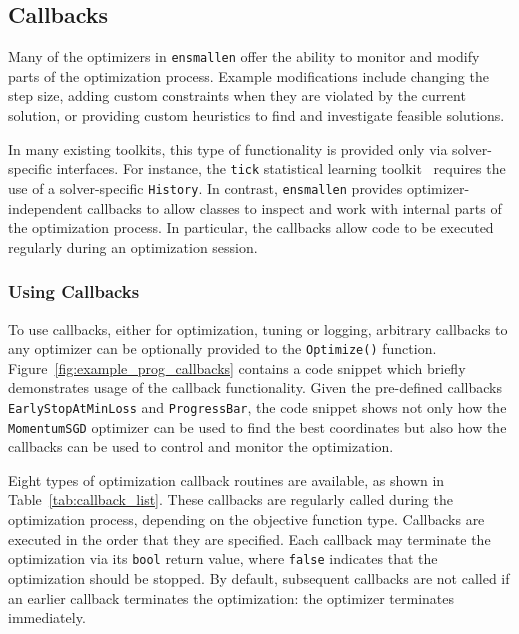 \subsection{Callbacks}
\label{sec:callbacks}

Many of the optimizers in {\tt ensmallen} offer the ability to monitor
and modify parts of the optimization process.
Example modifications include changing the step size,
adding custom constraints when they are violated by the current solution,
or providing custom heuristics to find and investigate feasible solutions.

In many existing toolkits, this type of functionality is provided only via
solver-specific interfaces.  For instance, the {\tt tick} statistical learning
toolkit~\cite{bacry2017tick} requires the use of a solver-specific {\tt History}.
In contrast, {\tt ensmallen} provides optimizer-independent callbacks to allow
classes to inspect and work with internal parts of the optimization process.
In particular, the callbacks allow code to be
executed regularly during an optimization session.


\subsubsection{Using Callbacks}

To use callbacks, either for optimization, tuning or logging, 
arbitrary callbacks to any optimizer can be optionally provided
to the {\tt Optimize()} function.
Figure~\ref{fig:example_prog_callbacks} contains a code snippet which
briefly demonstrates usage of the callback functionality.  Given the pre-defined
callbacks {\tt EarlyStopAtMinLoss} and {\tt ProgressBar}, the code snippet shows
not only how the {\tt MomentumSGD} optimizer can be used to find the best
coordinates but also how the callbacks can be used to control and monitor the
optimization.

Eight types of optimization callback routines are available,
as shown in Table~\ref{tab:callback_list}.
These callbacks are regularly called during the optimization process,
depending on the objective function type.
Callbacks are executed in the order that they are specified.
Each callback may terminate the optimization via its {\tt bool} return value,
where {\tt false} indicates that the optimization should be stopped.
By default, subsequent callbacks are not called if an earlier callback terminates
the optimization: the optimizer terminates immediately.

